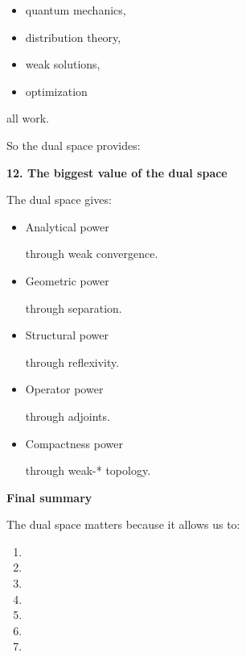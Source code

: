 \documentclass[12pt,a4paper]{report}
\begin{document}
\begin{description}
	\begin{itemize}
    \item quantum mechanics,
    \item distribution theory,
    \item weak solutions,
    \item optimization
	\end{itemize}

all work.

So the dual space provides:

\> 

\item \textbf{12. The biggest value of the dual space}

The dual space gives:

	\begin{itemize}
        \item Analytical power

through weak convergence.

        \item Geometric power

through separation.

        \item Structural power

through reflexivity.

        \item Operator power

through adjoints.

        \item Compactness power

through weak-* topology.

	\end{itemize}

\item \textbf{Final summary}

The dual space matters because it allows us to:

\begin{enumerate}
\item {}
\item {}
\item {}
\item {}
\item {}
\item {}
\item {}
\end{enumerate}


\end{description}
\end{document}
